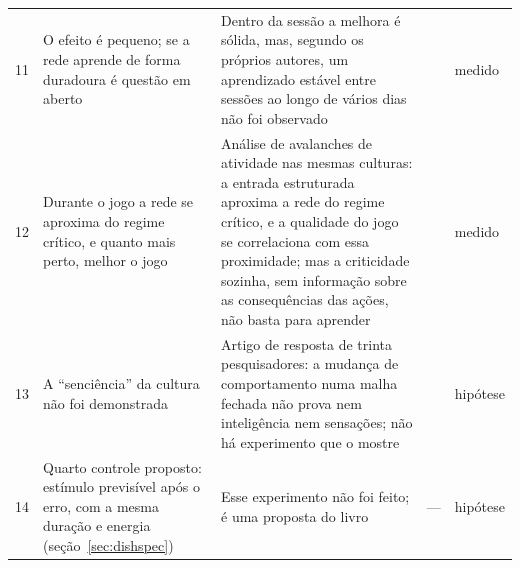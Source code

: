 {\begin{longtable}{>{\raggedright}p{0.5cm}>{\raggedright}p{4.0cm}>{\raggedright}p{5.6cm}>{\raggedright}p{2.3cm}>{\raggedright\arraybackslash}p{1.7cm}}
11 & O efeito é pequeno; se a rede aprende de forma duradoura é questão em aberto & Dentro da sessão a melhora é sólida, mas, segundo os próprios autores, um aprendizado estável entre sessões ao longo de vários dias não foi observado & \cite{Kagan2022} & medido \\
12 & Durante o jogo a rede se aproxima do regime crítico, e quanto mais perto, melhor o jogo & Análise de avalanches de atividade nas mesmas culturas: a entrada estruturada aproxima a rede do regime crítico, e a qualidade do jogo se correlaciona com essa proximidade; mas a criticidade sozinha, sem informação sobre as consequências das ações, não basta para aprender & \cite{Habibollahi2023} & medido \\
13 & A ``senciência'' da cultura não foi demonstrada & Artigo de resposta de trinta pesquisadores: a mudança de comportamento numa malha fechada não prova nem inteligência nem sensações; não há experimento que o mostre & \cite{Balci2023} & hipótese \\
14 & Quarto controle proposto: estímulo previsível após o erro, com a mesma duração e energia (seção~\ref{sec:dishspec}) & Esse experimento não foi feito; é uma proposta do livro & --- & hipótese \\
\bottomrule
\end{longtable}}
